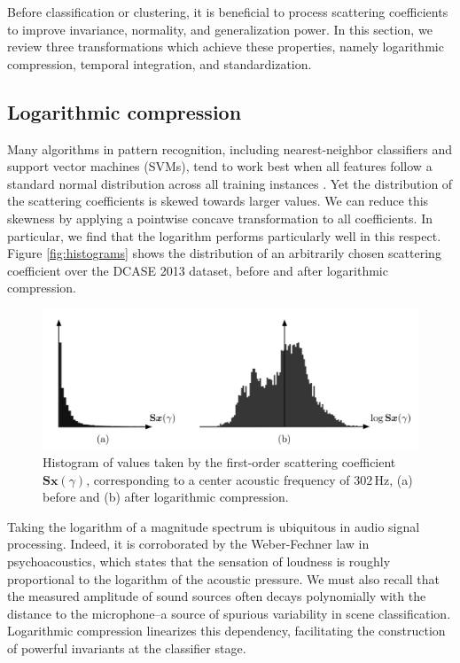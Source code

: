 \documentclass[journal]{IEEEtran}
\begin{document}
Before classification or clustering, it is beneficial to process scattering coefficients to improve invariance, normality, and generalization power.
In this section, we review three transformations which achieve these properties, namely logarithmic compression, temporal integration, and standardization.

\subsection{Logarithmic compression}
\label{sec:logcomp}

Many algorithms in pattern recognition, including nearest-neighbor classifiers and support vector machines (SVMs), tend to work best when all features follow a standard normal distribution across all training instances \cite{Hsu2003}.
Yet the distribution of the scattering coefficients is skewed towards larger values. We can reduce this skewness by applying a pointwise concave transformation to all coefficients. In particular, we find that the logarithm performs particularly well in this respect.
Figure \ref{fig:histograms} shows the distribution of an arbitrarily chosen scattering coefficient over the DCASE 2013 dataset, before and after logarithmic compression.

\begin{figure}
\begin{center}
\includegraphics[width=\columnwidth]{bw/compression}
\caption{
\label{fig:histograms}
Histogram of values taken by the first-order scattering coefficient $\mathbf{S}\boldsymbol{x}(\gamma)$, corresponding to a center acoustic frequency of $302\,\mathrm{Hz}$,
(a) before and (b) after logarithmic compression.}
\label{fig:compression}
\end{center}
\end{figure}


Taking the logarithm of a magnitude spectrum is ubiquitous in audio signal processing.
Indeed, it is corroborated by the Weber-Fechner law in psychoacoustics, which states that the sensation of loudness is roughly proportional to the logarithm of the acoustic pressure. 
We must also recall that the measured amplitude of sound sources often decays polynomially with the distance to the microphone--a source of spurious variability in scene classification.
Logarithmic compression linearizes this dependency, facilitating the construction of powerful invariants at the classifier stage.
\end{document}
